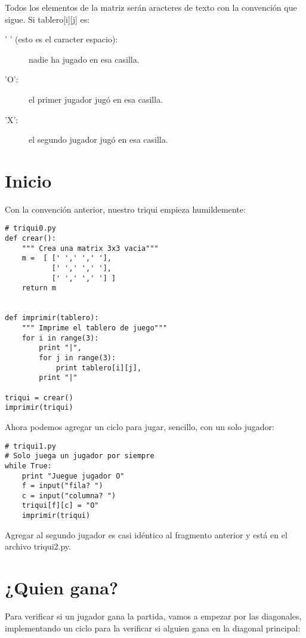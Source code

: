 Todos los elementos de la matriz serán aracteres de texto con la 
convención que sigue. Si tablero[i][j] es:

\begin{description}
  \item[' ' (esto es el caracter espacio):]   nadie ha jugado en esa casilla.
  \item['O': ] el primer jugador jugó en esa casilla.
  \item['X':] el segundo jugador jugó en esa casilla.
\end{description}

\section{Inicio}

Con la convención anterior, nuestro triqui empieza humildemente:

\beforeverb
\begin{verbatim}
# triqui0.py
def crear():
    """ Crea una matrix 3x3 vacia"""
    m =  [ [' ',' ',' '],
           [' ',' ',' '],
           [' ',' ',' '] ]
    return m


def imprimir(tablero):
    """ Imprime el tablero de juego"""
    for i in range(3):
        print "|",
        for j in range(3):
            print tablero[i][j],
        print "|"
        
triqui = crear()
imprimir(triqui)
\end{verbatim}
\afterverb

Ahora podemos agregar un ciclo para jugar, sencillo, con un solo jugador:

\beforeverb
\begin{verbatim}
# triqui1.py
# Solo juega un jugador por siempre 
while True:
    print "Juegue jugador O"
    f = input("fila? ")
    c = input("columna? ")
    triqui[f][c] = "O"
    imprimir(triqui)
\end{verbatim}
\afterverb

Agregar al segundo jugador es casi idéntico al fragmento anterior y  está en el 
archivo triqui2.py. 

\section{¿Quien gana?}

Para verificar si un jugador gana la partida, vamos a empezar por las diagonales, 
implementando un ciclo para la verificar si alguien gana en la diagonal principal:

